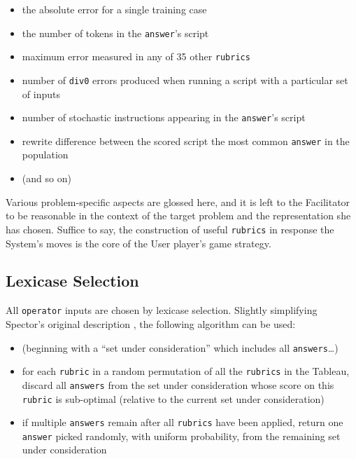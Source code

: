 \begin{itemize}
\item the absolute error for a single training case
\item the number of tokens in the \texttt{answer}'s script
\item maximum error measured in any of 35 other \texttt{rubrics}
\item number of \texttt{div0} errors produced when running a script with a particular set of inputs
\item number of stochastic instructions appearing in the \texttt{answer}'s script
\item rewrite difference between the scored script the most common \texttt{answer} in the population
\item (and so on)
\end{itemize}

Various problem-specific aspects are glossed here, and it is left to the Facilitator to be reasonable in the context of the target problem and the representation she has chosen. Suffice to say, the construction of useful \texttt{rubrics} in response the System's moves is the core of the User player's game strategy.

\subsection{Lexicase Selection}\hypertarget{lexicase-selection}{}\label{lexicase-selection}

All \texttt{operator} inputs are chosen by lexicase selection. Slightly simplifying Spector's original description \citep{Spector:2012:GECCOcompA}, the following algorithm can be used:

\begin{itemize}
\item (beginning with a ``set under consideration'' which includes all \texttt{answers}\ldots{})
\item for each \texttt{rubric} in a random permutation of all the \texttt{rubrics} in the Tableau, discard all \texttt{answers} from the set under consideration whose score on this \texttt{rubric} is sub-optimal (relative to the current set under consideration)
\item if multiple \texttt{answers} remain after all \texttt{rubrics} have been applied, return one \texttt{answer} picked randomly, with uniform probability, from the remaining set under consideration
\end{itemize}


